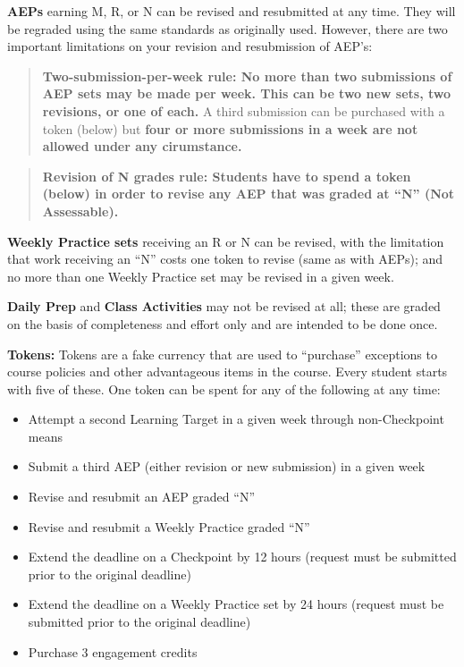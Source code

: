 \documentclass[]{article}
\providecommand{\tightlist}{%
  \setlength{\itemsep}{0pt}\setlength{\parskip}{0pt}}
\begin{document}
\textbf{AEPs} earning M, R, or N can be revised and resubmitted at any
time. They will be regraded using the same standards as originally used.
However, there are two important limitations on your revision and
resubmission of AEP's:

\begin{quote}
\textbf{Two-submission-per-week rule: No more than two submissions of
AEP sets may be made per week. This can be two new sets, two revisions,
or one of each.} A third submission can be purchased with a token
(below) but \textbf{four or more submissions in a week are not allowed
under any cirumstance.}
\end{quote}

\begin{quote}
\textbf{Revision of N grades rule: Students have to spend a token
(below) in order to revise any AEP that was graded at ``N'' (Not
Assessable).}
\end{quote}

\textbf{Weekly Practice sets} receiving an R or N can be revised, with
the limitation that work receiving an ``N'' costs one token to revise
(same as with AEPs); and no more than one Weekly Practice set may be
revised in a given week.

\textbf{Daily Prep} and \textbf{Class Activities} may not be revised at
all; these are graded on the basis of completeness and effort only and
are intended to be done once.

\textbf{Tokens:} Tokens are a fake currency that are used to
``purchase'' exceptions to course policies and other advantageous items
in the course. Every student starts with five of these. One token can be
spent for any of the following at any time:

\begin{itemize}
\tightlist
\item
  Attempt a second Learning Target in a given week through
  non-Checkpoint means\\
\item
  Submit a third AEP (either revision or new submission) in a given week
\item
  Revise and resubmit an AEP graded ``N''
\item
  Revise and resubmit a Weekly Practice graded ``N''
\item
  Extend the deadline on a Checkpoint by 12 hours (request must be
  submitted prior to the original deadline)
\item
  Extend the deadline on a Weekly Practice set by 24 hours (request must
  be submitted prior to the original deadline)
\item
  Purchase 3 engagement credits
\end{itemize}
\end{document}
